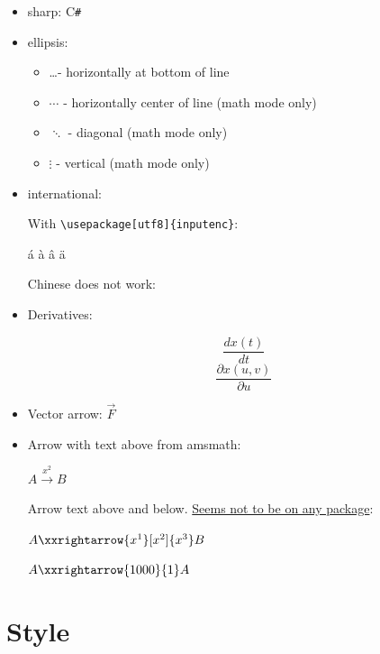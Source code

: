 \documentclass[12pt]{article}
\begin{document}
    \begin{itemize}
        \item sharp: C\verb|#|

        \item ellipsis:
        \begin{itemize}
            \item    \ldots - horizontally at bottom of line
            \item    $\cdots$ - horizontally center of line (math mode only)
            \item    $\ddots$ - diagonal (math mode only)
            \item    $\vdots$ - vertical (math mode only)
        \end{itemize}

        \item international:

            With \lstinline|\usepackage[utf8]{inputenc}|:

            á à â ä

            Chinese does not work: %

        \item Derivatives:

           $$ \frac{dx(t)}{dt} $$
           $$ \frac{\partial x(u,v)}{\partial u} $$

       \item Vector arrow: $\vec{F}$

        \item
            Arrow with text above from amsmath:

                $A\xrightarrow{x^2}B$

            Arrow text above and below. \href{http://tex.stackexchange.com/questions/27545/custom-length-arrows-text-over-and-under}{Seems not to be on any package}:

                $A\xxrightarrow{x^1}[x^2]{x^3}B$

                $A\xxrightarrow{1000}{1}A$

    \end{itemize}

\section{Style}\label{style}
\end{document}
